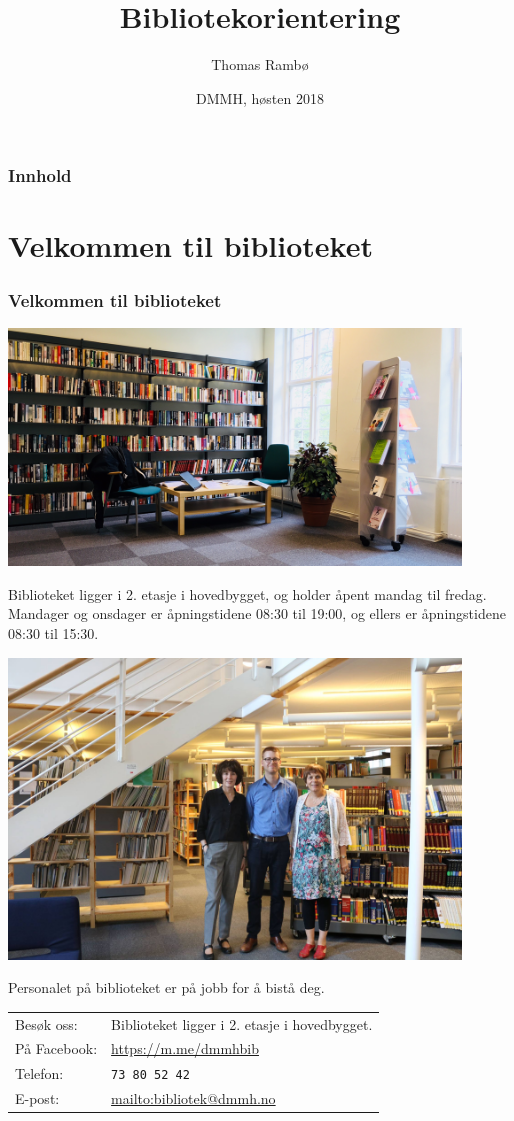 \documentclass{beamer}
\title{Bibliotekorientering}
\author{Thomas Rambø\inst{1}}
\institute[DMMH-biblioteket]{
  \inst{1}
  Biblioteket\\
  Dronning Mauds Minne Høgskole
}
\date[DMMH 2018]{DMMH, høsten 2018}
\begin{document}
\frame{\titlepage}
\begin{frame}
  \frametitle{Innhold}
  \tableofcontents
\end{frame}

\section{Velkommen til biblioteket}
\begin{frame}
  \frametitle{Velkommen til biblioteket}
  \centering
  \includegraphics[width=0.90\textwidth]{../media/nytt-bibliotek.png}
\end{frame}
\begin{frame}
  Biblioteket ligger i 2. etasje i hovedbygget, og holder åpent mandag til fredag. Mandager og onsdager er åpningstidene \alert{08:30 til 19:00}, og ellers er åpningstidene \alert{08:30 til 15:30}.
\end{frame}
\begin{frame}
  \centering
  \includegraphics[width=0.90\textwidth]{../media/bibliotekansatte.jpg}
\end{frame}
\begin{frame}
  Personalet på biblioteket er på jobb for å bistå deg.

  \vfill
  \begin{tabular}{ l | l }
    Besøk oss: & Biblioteket ligger i 2. etasje i hovedbygget. \\
    På Facebook: & \url{https://m.me/dmmhbib} \\
    Telefon: & \texttt{73 80 52 42} \\
    E-post: & \url{mailto:bibliotek@dmmh.no}
  \end{tabular}
\end{frame}
\end{document}
